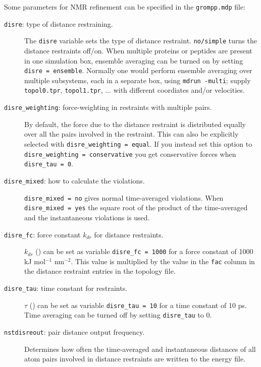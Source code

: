 Some parameters for NMR refinement can be specified in the
{\tt grompp.mdp} file:
\begin{description}
\item[{\tt disre}: type of distance restraining.]
        The {\tt disre} variable sets the type of distance restraint.
        {\tt no/simple} turns the distance restraints off/on.
        When multiple proteins or peptides are present in one 
        simulation box, ensemble averaging 
        can be turned on by setting {\tt disre = ensemble}.
	Normally one would perform ensemble averaging over multiple
	subsystems, each in a separate box, using {\tt mdrun -multi};
	supply {\tt topol0.tpr}, {\tt topol1.tpr}, ... with different
	coordiates and/or velocities.
\item[{\tt disre\_weighting}: force-weighting in restraints with
         multiple pairs.]
        By default, the force due to the distance restraint is distributed equally
        over all the pairs involved in the restraint. This can also be
        explicitly selected with
        {\tt disre\_weighting = equal}. 
        If you instead set this option to {\tt disre\_weighting = conservative}
        you get conservative forces when {\tt disre\_tau = 0}.
\item[{\tt disre\_mixed}: how to calculate the violations.]
        {\tt disre\_mixed = no} gives normal time-averaged violations.
        When {\tt disre\_mixed = yes} the square root of the
        product of the time-averaged and the instantaneous
        violations is used.
\item[{\tt disre\_fc}: force constant $k_{dr}$ for distance restraints.] 
        $k_{dr}$  () can be set
        as variable {\tt disre\_fc = 1000} for a force constant of
        1000 {kJ mol$^{-1}$ nm$^{-2}$}. This value is multiplied by
        the value in the {\tt fac} column in the distance restraint
        entries in the topology file.
\item[{\tt disre\_tau}: time constant for restraints.] 
        $\tau$ () can be set
        as variable {\tt disre\_tau = 10} for a time constant of
        10 ps. Time averaging can be turned off by setting {\tt disre\_tau}
        to 0.
\item[{\tt nstdisreout}: pair distance output frequency.]
        Determines how often the time-averaged and 
        instantaneous distances of all atom pairs involved in
        distance restraints are written to the energy file.
\end{description}


